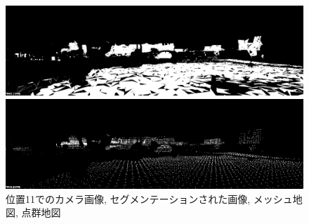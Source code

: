 \begin{figure}[htbp]
\begin{minipage}[b]{0.50\hsize}
\begin{center}
  \end{center}
 \end{minipage} \\
  \begin{minipage}[b]{0.50\hsize}
 \begin{center}
  \includegraphics[keepaspectratio, scale=0.18]{./picture/valued_mesh_map_image/image10.jpg}
  \end{center}
 \end{minipage}
 \begin{minipage}[b]{0.50\hsize}
 \begin{center}
  \includegraphics[keepaspectratio, scale=0.18]{./picture/valued_point_map_image/image10.jpg}
  \end{center}
 \end{minipage}
 \caption{位置11でのカメラ画像, セグメンテーションされた画像, メッシュ地図, 点群地図}\label{fig:place11}
\end{figure}

